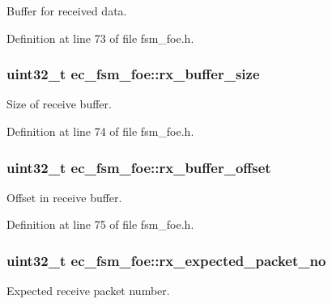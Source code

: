 Buffer for received data. 



Definition at line 73 of file fsm\-\_\-foe.\-h.

\subsubsection[{rx\-\_\-buffer\-\_\-size}]{\setlength{\rightskip}{0pt plus 5cm}uint32\-\_\-t ec\-\_\-fsm\-\_\-foe\-::rx\-\_\-buffer\-\_\-size}\label{structec__fsm__foe_ad44c7d17687802d770d8c455caa2e490}


Size of receive buffer. 



Definition at line 74 of file fsm\-\_\-foe.\-h.

\subsubsection[{rx\-\_\-buffer\-\_\-offset}]{\setlength{\rightskip}{0pt plus 5cm}uint32\-\_\-t ec\-\_\-fsm\-\_\-foe\-::rx\-\_\-buffer\-\_\-offset}\label{structec__fsm__foe_a92ba79d9ab8dfcb3a57ff98e05450a85}


Offset in receive buffer. 



Definition at line 75 of file fsm\-\_\-foe.\-h.

\subsubsection[{rx\-\_\-expected\-\_\-packet\-\_\-no}]{\setlength{\rightskip}{0pt plus 5cm}uint32\-\_\-t ec\-\_\-fsm\-\_\-foe\-::rx\-\_\-expected\-\_\-packet\-\_\-no}\label{structec__fsm__foe_a6497d12beaa6dba428a4014579a5515f}


Expected receive packet number. 



